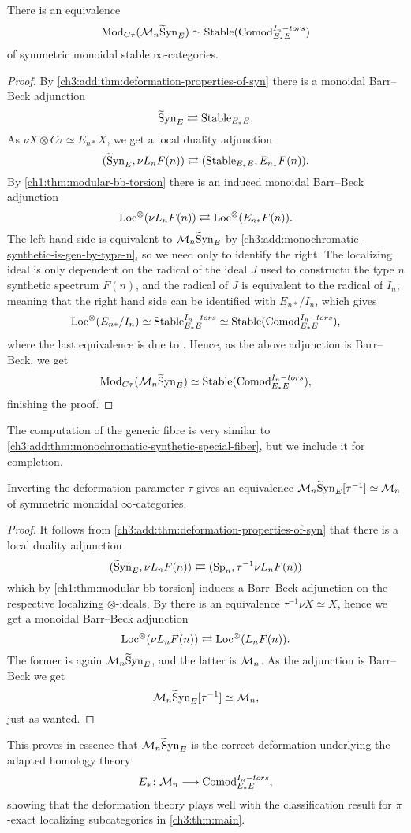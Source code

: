 \begin{theorem}
    \label{ch3:add:thm:monochromatic-synthetic-special-fiber}
    There is an equivalence
    \[\mathrm{Mod}_{C\tau}(\mathcal{M}_{n}\widetilde{\mathrm{S}}\mathrm{yn}_{E}) \simeq \mathrm{Stable}(\mathrm{Comod}_{E_*E}^{I_n-tors})\]
    of symmetric monoidal stable $\infty$-categories. 
\end{theorem}
\begin{proof}
    By \cref{ch3:add:thm:deformation-properties-of-syn} there is a monoidal Barr--Beck adjunction 
    \[\widetilde{\mathrm{S}}\mathrm{yn}_{E} \rightleftarrows \mathrm{Stable}_{E_*E}.\]
    As $\nu X \otimes C\tau \simeq E_{n*} X$, we get a local duality adjunction 
    \[(\widetilde{\mathrm{S}}\mathrm{yn}_{E}, \nu L_n F(n))\rightleftarrows (\mathrm{Stable}_{E_*E}, E_{n_*}F(n)).\]
    By \cref{ch1:thm:modular-bb-torsion} there is an induced monoidal Barr--Beck adjunction 
    \[\operatorname{Loc}^\otimes(\nu L_n F(n))\rightleftarrows \operatorname{Loc}^\otimes(E_{n*}F(n)).\]
    The left hand side is equivalent to $\mathcal{M}_{n}\widetilde{\mathrm{S}}\mathrm{yn}_{E}$ by \cref{ch3:add:monochromatic-synthetic-is-gen-by-type-n}, so we need only to identify the right. The localizing ideal is only dependent on the radical of the ideal $J$ used to constructu the type $n$ synthetic spectrum $F(n)$, and the radical of $J$ is equivalent to the radical of $I_n$, meaning that the right hand side can be identified with $E_{n*}/I_n$, which gives 
    \[\operatorname{Loc}^\otimes(E_{n*}/I_n) \simeq \mathrm{Stable}_{E_*E}^{I_n-tors}\simeq \mathrm{Stable}(\mathrm{Comod}_{E_*E}^{I_n-tors}),\]
    where the last equivalence is due to \cite[3.17]{barthel-heard-valenzuela_2020}. Hence, as the above adjunction is Barr--Beck, we get 
    \[\mathrm{Mod}_{C\tau}(\mathcal{M}_{n}\widetilde{\mathrm{S}}\mathrm{yn}_{E}) \simeq \mathrm{Stable}(\mathrm{Comod}_{E_*E}^{I_n-tors}),\]
    finishing the proof. 
\end{proof}

The computation of the generic fibre is very similar to \cref{ch3:add:thm:monochromatic-synthetic-special-fiber}, but we include it for completion. 

\begin{theorem}
    Inverting the deformation parameter $\tau$ gives an equivalence $\mathcal{M}_{n}\widetilde{\mathrm{S}}\mathrm{yn}_{E}[\tau^{-1}] \simeq \mathcal{M}_{n}$ of symmetric monoidal $\infty$-categories. 
\end{theorem}
\begin{proof}
    It follows from \cref{ch3:add:thm:deformation-properties-of-syn} that there is a local duality adjunction 
    \[(\widetilde{\mathrm{S}}\mathrm{yn}_{E}, \nu L_n F(n)) \rightleftarrows (\mathrm{Sp}_n, \tau^{-1}\nu L_n F(n))\]
    which by \cref{ch1:thm:modular-bb-torsion} induces a Barr--Beck adjunction on the respective localizing $\otimes$-ideals. By \cite[4.40]{pstragowski_2022} there is an equivalence $\tau^{-1}\nu X \simeq X$, hence we get a monoidal Barr--Beck adjunction 
    \[\operatorname{Loc}^\otimes(\nu L_n F(n))\rightleftarrows \operatorname{Loc}^\otimes(L_n F(n)).\]
    The former is again $\mathcal{M}_{n}\widetilde{\mathrm{S}}\mathrm{yn}_{E}$, and the latter is $\mathcal{M}_{n}$. As the adjunction is Barr--Beck we get 
    \[\mathcal{M}_{n}\widetilde{\mathrm{S}}\mathrm{yn}_{E}[\tau^{-1}]\simeq \mathcal{M}_{n},\]
    just as wanted. 
\end{proof}

This proves in essence that $\mathcal{M}_{n}\widetilde{\mathrm{S}}\mathrm{yn}_{E}$ is the correct deformation underlying the adapted homology theory 
\[E_*\colon \mathcal{M}_{n}\longrightarrow \mathrm{Comod}_{E_*E}^{I_n-tors},\] 
showing that the deformation theory plays well with the classification result for $\pi$-exact localizing subcategories in \cref{ch3:thm:main}. 






